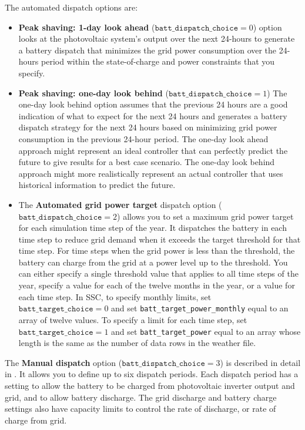 \documentclass[12pt,letterpaper]{article}
\begin{document}
The automated dispatch options are:

\begin{itemize}
\item \textbf{Peak shaving: 1-day look ahead} ($\texttt{batt\_dispatch\_choice}=0$) option looks at the photovoltaic system's output over the next 24-hours to generate a battery dispatch that minimizes the grid power consumption over the 24-hours period within the state-of-charge and power constraints that you specify. 

\item \textbf{Peak shaving: one-day look behind} ($\texttt{batt\_dispatch\_choice}=1$) The one-day look behind option assumes that the previous 24 hours are a good indication of what to expect for the next 24 hours and generates a battery dispatch strategy for the next 24 hours based on minimizing grid power consumption in the previous 24-hour period. The one-day look ahead approach might represent an ideal controller that can perfectly predict the future to give results for a best case scenario. The one-day look behind approach might more realistically represent an actual controller that uses historical information to predict the future.

\item The \textbf{Automated grid power target} dispatch option ($\texttt{batt\_dispatch\_choice}=2$) allows you to set a maximum grid power target for each simulation time step of the year. It dispatches the battery in each time step to reduce grid demand when it exceeds the target threshold for that time step. For time steps when the grid power is less than the threshold, the battery can charge from the grid at a power level up to the threshold. You can either specify a single threshold value that applies to all time steps of the year, specify a value for each of the twelve months in the year, or a value for each time step. In SSC, to specify monthly limits, set  $\texttt{batt\_target\_choice} = 0$ and set \texttt{batt\_target\_power\_monthly} equal to an array of twelve values. To specify a limit for each time step, set $\texttt{batt\_target\_choice} = 1$ and set \texttt{batt\_target\_power} equal to an array whose length is the same as the number of data rows in the weather file.
\end{itemize}

The \textbf{Manual dispatch} option ($\texttt{batt\_dispatch\_choice}=3$) is described in detail in \citep{diorio2015a}. It allows you to  define up to six dispatch periods. Each dispatch period has a setting to allow the battery to be charged from photovoltaic inverter output and grid, and to allow battery discharge. The grid discharge and battery charge settings also have capacity limits to control the rate of discharge, or rate of charge from grid.
\end{document}
